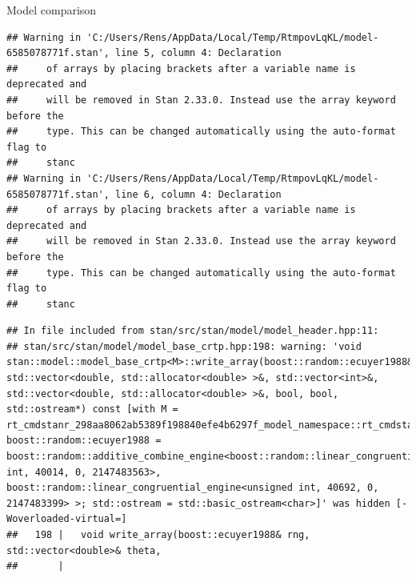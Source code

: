 \documentclass[
  ignorenonframetext,
]{beamer}
\begin{document}
\begin{frame}[fragile]{Model comparison}
\begin{verbatim}
## Warning in 'C:/Users/Rens/AppData/Local/Temp/RtmpovLqKL/model-6585078771f.stan', line 5, column 4: Declaration
##     of arrays by placing brackets after a variable name is deprecated and
##     will be removed in Stan 2.33.0. Instead use the array keyword before the
##     type. This can be changed automatically using the auto-format flag to
##     stanc
## Warning in 'C:/Users/Rens/AppData/Local/Temp/RtmpovLqKL/model-6585078771f.stan', line 6, column 4: Declaration
##     of arrays by placing brackets after a variable name is deprecated and
##     will be removed in Stan 2.33.0. Instead use the array keyword before the
##     type. This can be changed automatically using the auto-format flag to
##     stanc
\end{verbatim}

\begin{verbatim}
## In file included from stan/src/stan/model/model_header.hpp:11:
## stan/src/stan/model/model_base_crtp.hpp:198: warning: 'void stan::model::model_base_crtp<M>::write_array(boost::random::ecuyer1988&, std::vector<double, std::allocator<double> >&, std::vector<int>&, std::vector<double, std::allocator<double> >&, bool, bool, std::ostream*) const [with M = rt_cmdstanr_298aa8062ab5389f198840efe4b6297f_model_namespace::rt_cmdstanr_298aa8062ab5389f198840efe4b6297f_model; boost::random::ecuyer1988 = boost::random::additive_combine_engine<boost::random::linear_congruential_engine<unsigned int, 40014, 0, 2147483563>, boost::random::linear_congruential_engine<unsigned int, 40692, 0, 2147483399> >; std::ostream = std::basic_ostream<char>]' was hidden [-Woverloaded-virtual=]
##   198 |   void write_array(boost::ecuyer1988& rng, std::vector<double>& theta,
##       |
\end{verbatim}


\end{frame}
\end{document}
